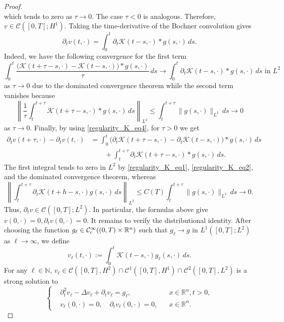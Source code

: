 \documentclass[11pt,reqno]{amsart}
\newcommand{\ity}{\infty}
\begin{document}
\begin{proof}
\[		\]
		which tends to zero as $\tau \to 0$. The case $\tau<0$ is analogous. Therefore, $v\in \mathcal{C}([0,T];H^1)$. Taking the time-derivative of the Bochner convolution gives
		\begin{equation}\label{regularity_K_eq4}
			\partial_tv(t,\cdot)=\int_0^t\partial_t \mathcal{K}(t-s,\cdot)\ast g(s,\cdot)\,ds.
		\end{equation}
		Indeed, we have the following convergence for the first term 
		\[
		\int_0^t
		\frac{\bigl(\mathcal{K}(t+\tau-s,\cdot)-\mathcal{K}(t-s,\cdot)\bigr)\ast g(s,\cdot)}{\tau}\,ds\to \int_0^t\partial_t \mathcal{K}(t-s,\cdot)\ast g(s,\cdot)\,ds\text{ in }L^2
		\]
		as $\tau\to 0$ due to the dominated convergence theorem while the second term vanishes because
		\[
		\left\|\frac{1}{\tau}\int_t^{t+\tau}\mathcal{K}(t+\tau-s,\cdot)\ast g(s,\cdot)\,ds \right\|_{L^2}\leq \int_t^{t+\tau}\|g(s,\cdot)\|_{L^2}\,ds\to 0
		\]
		as $\tau\to 0$. Finally, by using \eqref{regularity_K_eq4}, for $\tau>0$ we get
		\[
		\begin{aligned}
			\partial_tv(t+\tau,\cdot)-\partial_tv(t,\cdot)&=\int_0^t
			\bigl(\partial_t \mathcal{K}(t+\tau-s,\cdot)-\partial_t\mathcal{K}(t-s,\cdot)\bigr)\ast g(s,\cdot)\,ds\\
			&\qquad +\int_t^{t+\tau}\partial_t \mathcal{K}(t+\tau-s,\cdot)\ast g(s,\cdot)\,ds.
		\end{aligned}
		\]
		The first integral tends to zero in $L^2$ by \eqref{regularity_K_eq1}, \eqref{regularity_K_eq2}, and the dominated convergence theorem, whereas
		\[
		\left\|\int_t^{t+\tau}\partial_t\mathcal{K}(t+h-s,\cdot)g(s,\cdot)\,ds\right\|_{L^2}\leq C(T)\int_t^{t+\tau}\| g(s,\cdot)\|_{L^2}\,ds\to 0.
		\]
		Thus, $\partial_tv\in \mathcal{C}([0,T];L^2)$. In particular, the formulas above give $v(0,\cdot)=0, \partial_tv(0,\cdot)=0$. It remains to verify the distributional identity. After choosing the function $g_\ell\in \mathcal{C}^\infty_{\rm c}((0,T)\times\mathbb R^n)$ such that $g_\ell\to g$ in $L^1([0,T];L^2)$ as $\ell\to\ity$, we define
		\[
		v_\ell(t,\cdot):=\int_0^t\mathcal{K}(t-s,\cdot)g_\ell(s,\cdot)\,ds.
		\]
		For any $\ell\in\mathbb N$, $v_\ell\in \mathcal{C}([0,T],H^2)\cap \mathcal{C}^1([0,T],H^1)\cap \mathcal{C}^2([0,T],L^2)$ is a strong solution to
		\[
		\left\{
		\begin{aligned}
			&\partial_t^2v_\ell-\Delta v_\ell+\partial_tv_\ell=g_\ell,&&x\in \mathbb{R}^n,t>0,\\
			&v_\ell(0,\cdot)=0,\quad \partial_tv_\ell(0,\cdot)=0,&&x\in \mathbb{R}^n.
		\end{aligned}
\]
\end{proof}
\end{document}
